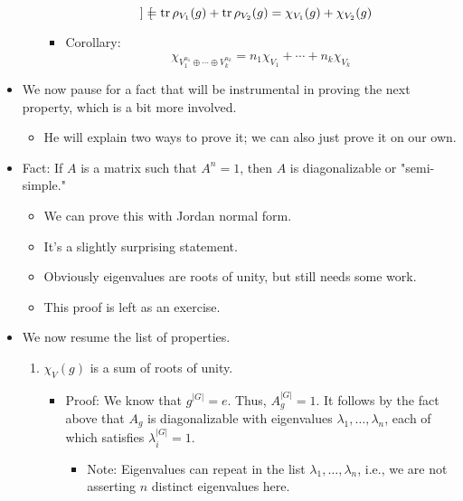 \documentclass[../notes.tex]{subfiles}
\begin{document}
\begin{itemize}
\begin{enumerate}
\begin{itemize}
\begin{equation*}
\begin{bmatrix}
                \end{bmatrix}
                = \tr\rho_{V_1}(g)+\tr\rho_{V_2}(g)
                = \chi_{V_1}(g)+\chi_{V_2}(g)
            \end{equation*}
            \item Corollary:
            \begin{equation*}
                \chi_{V_1^{n_1}\oplus\cdots\oplus V_k^{n_k}} = n_1\chi_{V_1}+\cdots+n_k\chi_{V_k}
            \end{equation*}
        \end{itemize}
    \end{enumerate}
    \item We now pause for a fact that will be instrumental in proving the next property, which is a bit more involved.
    \begin{itemize}
        \item He will explain two ways to prove it; we can also just prove it on our own.
    \end{itemize}
    \item Fact: If $A$ is a matrix such that $A^n=1$, then $A$ is diagonalizable or "semi-simple."
    \begin{itemize}
        \item We can prove this with Jordan normal form.
        \item It's a slightly surprising statement.
        \item Obviously eigenvalues are roots of unity, but still needs some work.
        \item This proof is left as an exercise.
    \end{itemize}
    \item We now resume the list of properties.
    \begin{enumerate}[resume]
        \item $\chi_V(g)$ is a sum of roots of unity.
        \begin{itemize}
            \item Proof: We know that $g^{|G|}=e$. Thus, $A_g^{|G|}=1$. It follows by the fact above that $A_g$ is diagonalizable with eigenvalues $\lambda_1,\dots,\lambda_n$, each of which satisfies $\lambda_i^{|G|}=1$.
            \begin{itemize}
                \item Note: Eigenvalues can repeat in the list $\lambda_1,\dots,\lambda_n$, i.e., we are not asserting $n$ distinct eigenvalues here.
            \end{itemize}

\end{itemize}
\end{enumerate}
\end{itemize}
\end{document}
